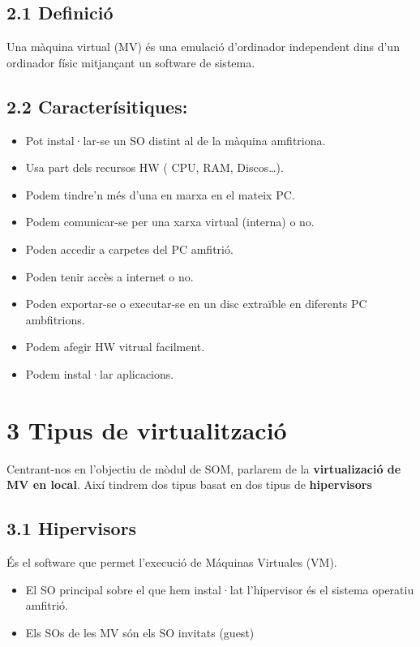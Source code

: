 \documentclass[
  12 pt,
  a4paper,
]{article}
\providecommand{\tightlist}{%
  \setlength{\itemsep}{0pt}\setlength{\parskip}{0pt}}
\begin{document}
\subsection{2.1 Definició}\label{definiciuxf3}

Una màquina virtual (MV) és una emulació d'ordinador independent dins
d'un ordinador físic mitjançant un software de sistema.

\subsection{2.2 Caracterísitiques:}\label{caracteruxedsitiques}

\begin{itemize}
\tightlist
\item
  Pot instal·lar-se un SO distint al de la màquina amfitriona.
\item
  Usa part dels recursos HW ( CPU, RAM, Discos\ldots).
\item
  Podem tindre'n més d'una en marxa en el mateix PC.
\item
  Podem comunicar-se per una xarxa virtual (interna) o no.
\item
  Poden accedir a carpetes del PC amfitrió.
\item
  Poden tenir accès a internet o no.
\item
  Poden exportar-se o executar-se en un disc extraïble en diferents PC
  ambfitrions.
\item
  Podem afegir HW vitrual facilment.
\item
  Podem instal·lar aplicacions.
\end{itemize}

\section{3 Tipus de virtualització}\label{tipus-de-virtualitzaciuxf3}

Centrant-nos en l'objectiu de mòdul de SOM, parlarem de la
\textbf{virtualizació de MV en local}. Així tindrem dos tipus basat en
dos tipus de \textbf{hipervisors}

\subsection{3.1 Hipervisors}\label{hipervisors}

És el software que permet l'execució de Máquinas Virtuales (VM).

\begin{itemize}
\item
  El SO principal sobre el que hem instal·lat l'hipervisor és el sistema
  operatiu amfitrió.
\item
  Els SOs de les MV són els SO invitats (guest)
\end{itemize}
\end{document}
